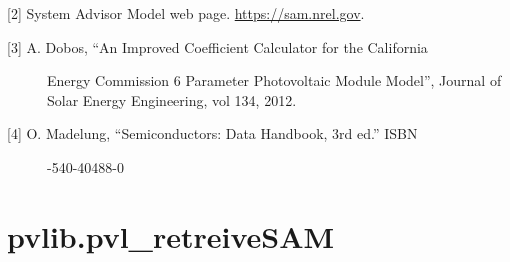 \documentclass[letterpaper,10pt,english]{sphinxmanual}
\begin{document}
\begin{fulllineitems}
\begin{description}
\end{description}

{[}2{]} System Advisor Model web page. \href{https://sam.nrel.gov}{https://sam.nrel.gov}.
\begin{description}
\item[{{[}3{]} A. Dobos, ``An Improved Coefficient Calculator for the California}] \leavevmode
Energy Commission 6 Parameter Photovoltaic Module Model'', Journal of
Solar Energy Engineering, vol 134, 2012.

\item[{{[}4{]} O. Madelung, ``Semiconductors: Data Handbook, 3rd ed.'' ISBN}] -540-40488-0

\end{description}

\end{fulllineitems}



\section{pvlib.pvl\_retreiveSAM}
\label{stubs/pvlib.pvl_retreiveSAM:pvlib-pvl-retreivesam}\label{stubs/pvlib.pvl_retreiveSAM::doc}
\end{document}
